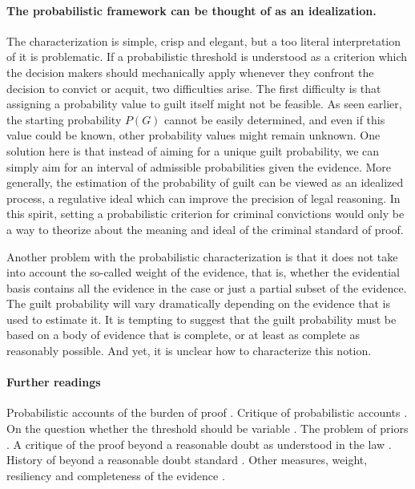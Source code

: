 \documentclass[10pt]{article}
\begin{document}

\paragraph{The probabilistic framework can be thought of as an idealization.}

The characterization is simple, crisp and elegant, but a too literal interpretation of it is problematic.  If a probabilistic threshold is understood as a criterion which the decision makers 
 should mechanically apply whenever they confront the decision to convict or acquit, two difficulties arise. The first difficulty is that assigning a probability value to guilt itself might not be feasible. As seen earlier, the starting probability $P(G)$ cannot be easily determined, 
and even if this value could be known, other probability values might remain unknown. One solution here is that instead 
 of aiming for a unique guilt probability, we can simply aim for an interval of admissible probabilities given the evidence. 
 More generally, the estimation of the probability of guilt can be viewed as an idealized process, a regulative ideal which can improve the precision of legal reasoning. 
In this spirit, setting a probabilistic criterion for criminal convictions would only be a way 
to theorize about the meaning and ideal of the criminal standard of proof. 

Another problem with the probabilistic characterization 
is that it does not take into account the so-called weight of the evidence, that is, whether the evidential basis contains all the evidence 
in the case or just a partial subset of the evidence. The guilt probability will vary dramatically 
depending on the evidence that is used to estimate it. It is tempting to suggest that the guilt probability must be based on a body 
of evidence that is complete, or at least as complete as reasonably possible. And yet, it is unclear how to characterize this notion.

\paragraph{Further readings}

Probabilistic accounts of the burden of proof
\citep{kaplan1968, kaye1986, kaye1999, hamer2004, cheng2013}.
Critique of probabilistic accounts \citep{cohen1977, nesson79, thomson86, stein05, ho08, pardoAllen2008, haack2011}.
On the question whether the threshold should be variable \citep{kaplow2012, picinali2013}.
The problem of priors \citep{finkelsteinFairley1970, friedman2000}.
A critique of the proof beyond a reasonable doubt  
as understood in the law \citep{laudan2006}.
History of beyond a reasonable doubt standard 
\citep{shapiro1991, whitman2008}. Other measures, weight, resiliency and completeness 
of the evidence \citep{kaye1999, stein05}.
\end{document}
